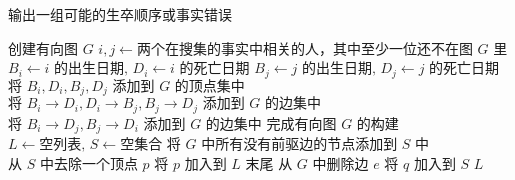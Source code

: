 \documentclass[11pt]{article}
\begin{document}
  \begin{CJK*}{UTF8}{gkai}
    \begin{algorithm}
      \caption{输出一组可能的生卒顺序或事实错误}
      \begin{algorithmic}[1]
        \State $\text{创建有向图 }G$
          \State $i,j \gets \text{两个在搜集的事实中相关的人，其中至少一位还不在图 } G \text{ 里}$
          \State $B_i \gets i \text{ 的出生日期, } D_i \gets i \text{ 的死亡日期}$
          \State $B_j \gets j \text{ 的出生日期, } D_j \gets j \text{ 的死亡日期}$
          \State $\text{将 } B_i,D_i,B_j,D_j \text{ 添加到 } G \text{ 的顶点集中}$
            \State $\text{将 } B_i \to D_i, D_i \to B_j, B_j \to D_j \text{ 添加到 } G \text{ 的边集中}$
            \State $\text{将 } B_i \to D_j, B_j \to D_i \text{ 添加到 } G \text{ 的边集中}$
          \EndIf
        \EndWhile \Comment $\text{完成有向图 } G \text{ 的构建}$
        \State $L \gets \text{空列表, } S \gets \text{空集合}$
        \State $\text{将 } G \text{ 中所有没有前驱边的节点添加到 } S \text{ 中}$
          \State $\text{从 } S \text{ 中去除一个顶点 } p$
          \State $\text{将 } p \text{ 加入到 } L \text{ 末尾}$
            \State $\text{从 } G \text{ 中删除边 } e$
              \State $\text{将 } q \text{ 加入到 } S$
            \EndIf
          \EndFor
        \EndWhile
          \State \Return {}
        \Else
          \State \Return $L$ \Comment {}
        \EndIf
      \end{algorithmic}
    \end{algorithm}
  \end{CJK*}
  
\end{document}
